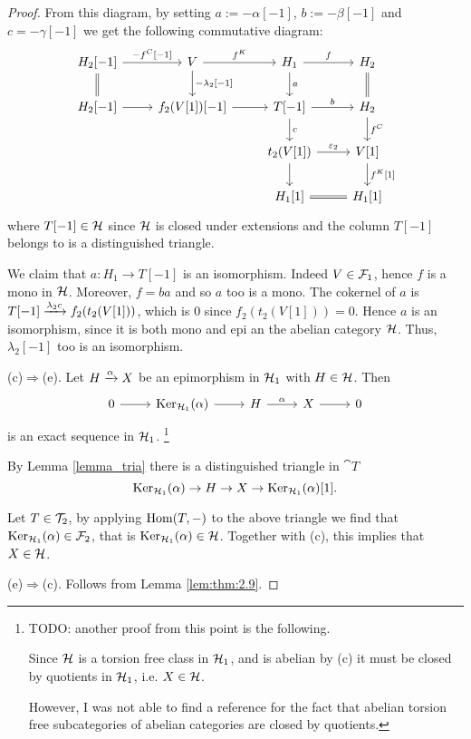 \begin{proof}
  \smallskip\noindent
  

  From this diagram, by setting $a:= -\alpha[-1]$, $b:=-\beta[-1]$ and $c=-\gamma[-1]$ we get the following commutative diagram:
  \begin{equation*}
    \begin{tikzcd}
      H_2[-1]\arrow{r}{-f^C[-1]}\arrow[equal]{d}
      & V\arrow{r}{f^K}\arrow{d}{-\lambda_2[-1]}
        & H_1\arrow{r}{f}\arrow{d}{a}
          & H_2\arrow[equal]{d}\\
      H_2[-1]\arrow{r}
      & f_2(V[1])[-1]\arrow{r}
        & T[-1]\arrow{r}{b}\arrow{d}{c}
          & H_2\arrow{d}{f^C}\\
      & & t_2(V[1])\arrow{r}{\varepsilon_2}\arrow{d}
          & V[1]\arrow{d}{f^K[1]}\\
      & & H_1[1]\arrow[equal]{r}
          & H_1[1]
    \end{tikzcd}
  \end{equation*}
  where $T[-1]\in\mathcal{H}$ since $\mathcal{H}$ is closed under extensions and the column $T[-1]$ belongs to is a distinguished triangle.

  We claim that $a:H_1\to T[-1]$ is an isomorphism. Indeed $V\in\mathcal{F}_1$, hence $f$ is a mono in $\mathcal{H}$. Moreover, $f=ba$ and so $a$ too is a mono. The cokernel of $a$ is $T[-1]\xrightarrow{\lambda_2 c}f_2(t_2(V[1]))$, which is $0$ since $f_2(t_2(V[1]))=0$. Hence $a$ is an isomorphism, since it is both mono and epi an the abelian category $\mathcal{H}$. Thus, $\lambda_2[-1]$ too is an isomorphism. 

  \smallskip\noindent
  (c)$\Rightarrow$(e). Let $H\xrightarrow{\alpha}X$ be an epimorphism in $\mathcal{H}_1$ with $H\in\mathcal{H}$. Then
  \begin{equation*}
    \begin{tikzcd}
      0\arrow{r}& \Ker_{\clH_1}(\alpha)\arrow{r}& H\arrow{r}{\alpha}& X\arrow{r} & 0
    \end{tikzcd}
  \end{equation*}
  is an exact sequence in $\mathcal{H}_1$.
  \footnote{TODO: another proof from this point is the following.

    Since $\mathcal{H}$ is a torsion free class in $\mathcal{H}_1$, and is abelian by (c) it must be closed by quotients in $\mathcal{H}_1$, i.e. $X\in\mathcal{H}$.

    However, I was not able to find a reference for the fact that abelian torsion free subcategories of abelian categories are closed by quotients.
}

By Lemma \ref{lemma_tria} there is a distinguished triangle in $\cat{T}$
\[ \operatorname{Ker}_{\mathcal{H}_1}(\alpha)\to H\to X\to \operatorname{Ker}_{\mathcal{H}_1}(\alpha)[1]. \]

Let $T\in\mathcal{T}_2$, by applying $\operatorname{Hom}(T,-)$ to the above triangle we find that $\operatorname{Ker}_{\mathcal{H}_1}(\alpha)\in\mathcal{F}_2$, that is $\operatorname{Ker}_{\mathcal{H}_1}(\alpha)\in\mathcal{H}$. Together with (c), this implies that $X\in\mathcal{H}$.

  \smallskip\noindent
  (e)$\Rightarrow$(c). Follows from Lemma \ref{lem:thm:2.9}.

\end{proof}


